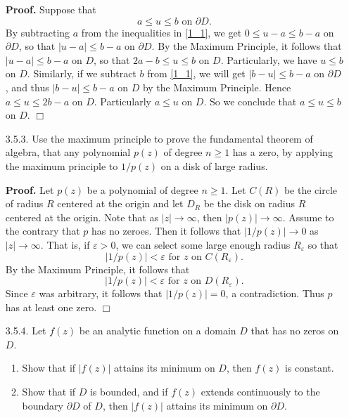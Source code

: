\documentclass[9pt]{article}
\newcommand{\qed}{\hfill \ensuremath{\Box}}
\begin{document}
\begin{enumerate}
      \textbf{Proof.} Suppose that 
      \begin{equation} \label{1_1}
         a \le u \le b \text{ on  } \partial D.
      \end{equation}
      By subtracting $a$ from the inequalities in \eqref{1_1}, we get
      $0 \le u - a \le b - a$ on $\partial D$, so that $|u - a| \le b - a$ on
      $\partial D$. By the Maximum Principle, it follows that
      $|u - a| \le b - a$ on $D$, so that $2a - b \le u \le b$ on $D$.
      Particularly, we have $u \le b$ on $D$. Similarly, if we subtract $b$
      from \eqref{1_1}, we will get $|b - u| \le b -a$ on $\partial D$, and
      thus $|b - u| \le b - a$ on $D$ by the Maximum Principle. Hence
      $a \le u \le 2b - a$ on $D$. Particularly $a \le u$ on $D$. So we conclude
      that $a \le u \le b$ on $D$. \qed
   \item[3.5.3.]  Use the maximum principle to prove the fundamental theorem of
                  algebra, that any polynomial $p(z)$ of degree $n \ge 1$ has a
                  zero, by applying the maximum principle to $1/p(z)$ on a disk
                  of large radius.
                  
      \textbf{Proof.} Let $p(z)$ be a polynomial of degree $n \ge 1$. Let $C(R)$
      be the circle of radius $R$ centered at the origin and let $D_R$
      be the disk on radius $R$ centered at the origin. Note that as $|z| \rightarrow \infty$, then
      $|p(z)| \rightarrow \infty$. Assume to the contrary that $p$ has no
      zeroes. Then it follows that $|1/p(z)| \rightarrow 0$ as
      $|z| \rightarrow \infty$. That is, if $\varepsilon > 0$, we can
      select some large enough radius $R_\varepsilon$ so that
      $$|1/p(z)| < \varepsilon \text{ for } z \text{ on } C(R_\varepsilon).$$
      By the Maximum Principle, it follows that
      $$|1/p(z)| < \varepsilon \text{ for } z \text{ on } D(R_\varepsilon).$$
      Since $\varepsilon$ was arbitrary, it follows that
      $|1/p(z)| = 0$, a contradiction. Thus $p$ has at least one zero. \qed
   \item[3.5.4.]  Let $f(z)$ be an analytic function on a domain $D$ that has no
                  zeros on $D$.
                  \begin{enumerate}
                     \item Show that if $|f(z)|$ attains its minimum on $D$,
                           then $f(z)$ is constant.
                     \item Show that if $D$ is bounded, and if $f(z)$ extends
                           continuously to the boundary $\partial D$ of $D$,
                           then $|f(z)|$ attains its minimum on $\partial D$.
                  \end{enumerate}
                  

\end{enumerate}
\end{document}
